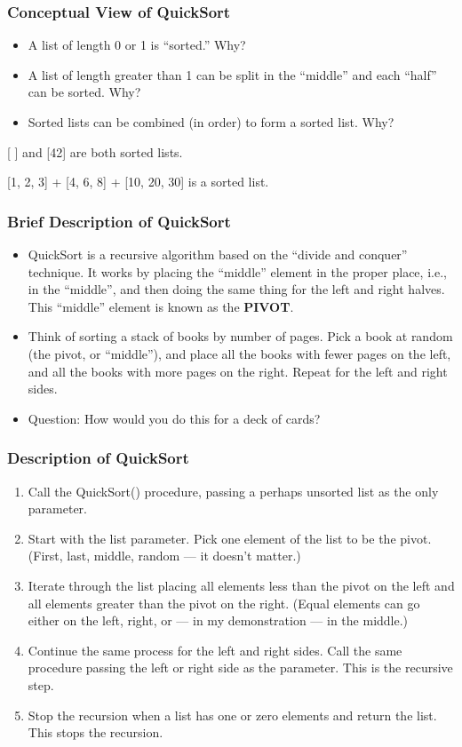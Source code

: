 \documentclass{beamer}
\begin{document}
    \begin{frame}
        \frametitle{Conceptual View of QuickSort}
        \begin{itemize}
            \item A list of length 0 or 1 is ``sorted.'' Why?
            \item A list of length greater than 1 can be split in the ``middle'' and each ``half'' can be sorted. Why?
            \item Sorted lists can be combined (in order) to form a sorted list. Why?
        \end{itemize}
        \par \Large [ ] and [42] are both sorted lists.
        \par \Large [1, 2, 3] + [4, 6, 8] + [10, 20, 30] is a sorted list.
    \end{frame}

    \begin{frame}
        \frametitle{Brief Description of QuickSort}
        \begin{itemize}
            \item QuickSort is a recursive algorithm based on the ``divide and conquer'' technique. It works by placing the ``middle'' element in the proper place, i.e., in the ``middle'', and then doing the same thing for the left and right halves. This ``middle'' element is known as the \textbf{PIVOT}.
            \item Think of sorting a stack of books by number of pages. Pick a book at random (the pivot, or ``middle''), and place all the books with fewer pages on the left, and all the books with more pages on the right. Repeat for the left and right sides.
            \item Question: How would you do this for a deck of cards?
        \end{itemize}
    \end{frame}

    \begin{frame}
        \frametitle{Description of QuickSort}
        \begin{enumerate}
            \item Call the QuickSort() procedure, passing a perhaps unsorted list as the only parameter.
            \item Start with the list parameter. Pick one element of the list to be the pivot. (First, last, middle, random --- it doesn't matter.)
            \item Iterate through the list placing all elements less than the pivot on the left and all elements greater than the pivot on the right. (Equal elements can go either on the left, right, or --- in my demonstration --- in the middle.)
            \item Continue the same process for the left and right sides. Call the same procedure passing the left or right side as the parameter. This is the recursive step.
            \item Stop the recursion when a list has one or zero elements and return the list. This stops the recursion.
        \end{enumerate}
    \end{frame}
\end{document}

